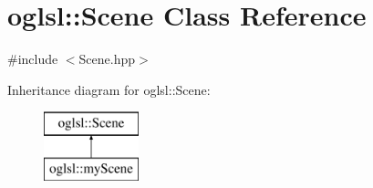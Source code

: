 \hypertarget{classoglsl_1_1_scene}{}\section{oglsl\+:\+:Scene Class Reference}
\label{classoglsl_1_1_scene}


{\ttfamily \#include $<$Scene.\+hpp$>$}

Inheritance diagram for oglsl\+:\+:Scene\+:\begin{figure}[H]
\begin{center}
\leavevmode
\includegraphics[height=2.000000cm]{classoglsl_1_1_scene}
\end{center}
\end{figure}
